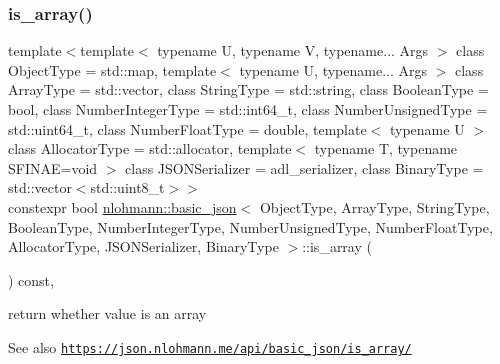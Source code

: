 \subsubsection{\texorpdfstring{is\+\_\+array()}{is\_array()}}
{\footnotesize\ttfamily template$<$template$<$ typename U, typename V, typename... Args $>$ class Object\+Type = std\+::map, template$<$ typename U, typename... Args $>$ class Array\+Type = std\+::vector, class String\+Type  = std\+::string, class Boolean\+Type  = bool, class Number\+Integer\+Type  = std\+::int64\+\_\+t, class Number\+Unsigned\+Type  = std\+::uint64\+\_\+t, class Number\+Float\+Type  = double, template$<$ typename U $>$ class Allocator\+Type = std\+::allocator, template$<$ typename T, typename S\+F\+I\+N\+A\+E=void $>$ class J\+S\+O\+N\+Serializer = adl\+\_\+serializer, class Binary\+Type  = std\+::vector$<$std\+::uint8\+\_\+t$>$$>$ \\
constexpr bool \hyperlink{classnlohmann_1_1basic__json}{nlohmann\+::basic\+\_\+json}$<$ Object\+Type, Array\+Type, String\+Type, Boolean\+Type, Number\+Integer\+Type, Number\+Unsigned\+Type, Number\+Float\+Type, Allocator\+Type, J\+S\+O\+N\+Serializer, Binary\+Type $>$\+::is\+\_\+array (\begin{DoxyParamCaption}{ }\end{DoxyParamCaption}) const\hspace{0.3cm}{\ttfamily [inline]}, {\ttfamily [noexcept]}}



return whether value is an array 

\begin{DoxySeeAlso}{See also}
\href{https://json.nlohmann.me/api/basic_json/is_array/}{\tt https\+://json.\+nlohmann.\+me/api/basic\+\_\+json/is\+\_\+array/} 
\end{DoxySeeAlso}
\mbox{\label{classnlohmann_1_1basic__json_a9576224f7b3ff812a308e7c1e784ea80}} 
